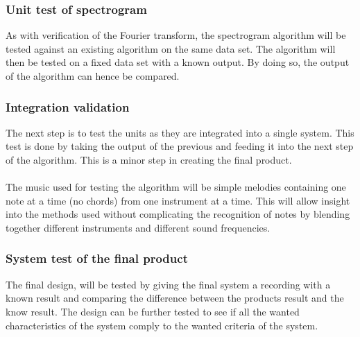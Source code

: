 \subsubsection{Unit test of spectrogram}
As with verification of the Fourier transform, the spectrogram algorithm will be tested against an existing algorithm on the same data set.
The algorithm will then be tested on a fixed data set with a known output.
By doing so, the output of the algorithm can hence be compared.
\subsubsection{Integration validation}
The next step is to test the units as they are integrated into a single system.
This test is done by taking the output of the previous and feeding it into the next step of the algorithm. 
This is a minor step in creating the final product.
\\\\
The music used for testing the algorithm will be simple melodies containing one note at a time (no chords) from one instrument at a time. This will allow insight into the methods used without complicating the recognition of notes by blending together different instruments and different sound frequencies.

\subsubsection{System test of the final product}
The final design, will be tested by giving the final system a recording with a known result and comparing the difference between the products result and the know result. The design can be further tested to see if all the wanted characteristics of the system comply to the wanted criteria of the system.

